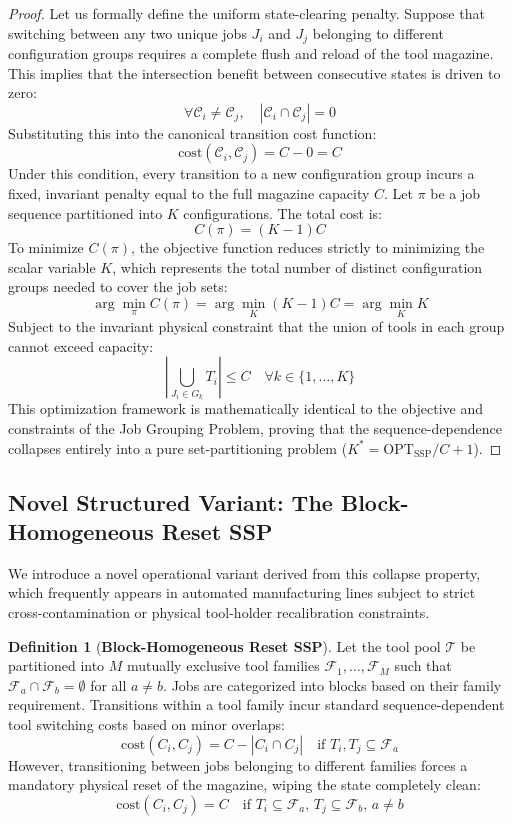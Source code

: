 \documentclass[11pt,a4paper]{article}
\theoremstyle{plain}
\theoremstyle{definition}
\newtheorem{definition}[theorem]{Definition}
\newcommand{\OPT}{\text{OPT}}
\newcommand{\SSP}{\text{SSP}}
\begin{document}
\begin{proof}
	Let us formally define the uniform state-clearing penalty. Suppose that switching between any two unique jobs $J_i$ and $J_j$ belonging to different configuration groups requires a complete flush and reload of the tool magazine. This implies that the intersection benefit between consecutive states is driven to zero:
	\[ \forall \mathcal{C}_i \neq \mathcal{C}_j, \quad |\mathcal{C}_i \cap \mathcal{C}_j| = 0 \]
	Substituting this into the canonical transition cost function:
	\[ \text{cost}(\mathcal{C}_i, \mathcal{C}_j) = C - 0 = C \]
	Under this condition, every transition to a new configuration group incurs a fixed, invariant penalty equal to the full magazine capacity $C$. Let $\pi$ be a job sequence partitioned into $K$ configurations. The total cost is:
	\[ C(\pi) = (K-1)C \]
	To minimize $C(\pi)$, the objective function reduces strictly to minimizing the scalar variable $K$, which represents the total number of distinct configuration groups needed to cover the job sets:
	\[ \arg\min_{\pi} C(\pi) = \arg\min_{K} (K-1)C = \arg\min_{K} K \]
	Subject to the invariant physical constraint that the union of tools in each group cannot exceed capacity:
	\[ \left| \bigcup_{J_i \in G_k} T_i \right| \le C \quad \forall k \in \{1, \dots, K\} \]
	This optimization framework is mathematically identical to the objective and constraints of the Job Grouping Problem, proving that the sequence-dependence collapses entirely into a pure set-partitioning problem ($K^* = \OPT_{\SSP}/C + 1$).
\end{proof}

\subsection{Novel Structured Variant: The Block-Homogeneous Reset SSP}
We introduce a novel operational variant derived from this collapse property, which frequently appears in automated manufacturing lines subject to strict cross-contamination or physical tool-holder recalibration constraints.

\begin{definition}[\textbf{Block-Homogeneous Reset SSP}]
	Let the tool pool $\mathcal{T}$ be partitioned into $M$ mutually exclusive tool families $\mathcal{F}_1, \dots, \mathcal{F}_M$ such that $\mathcal{F}_a \cap \mathcal{F}_b = \emptyset$ for all $a \neq b$. Jobs are categorized into blocks based on their family requirement. Transitions within a tool family incur standard sequence-dependent tool switching costs based on minor overlaps:
	\begin{equation}
		\text{cost}(C_i, C_j) = C - |C_i \cap C_j| \quad \text{if } T_i, T_j \subseteq \mathcal{F}_a
	\end{equation}
	However, transitioning between jobs belonging to different families forces a mandatory physical reset of the magazine, wiping the state completely clean:
	\begin{equation}
		\text{cost}(C_i, C_j) = C \quad \text{if } T_i \subseteq \mathcal{F}_a, \, T_j \subseteq \mathcal{F}_b, \, a \neq b
	\end{equation}
\end{definition}
\end{document}
